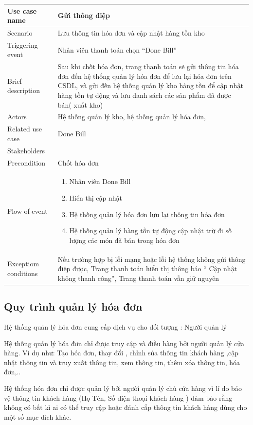\documentclass{article}
\begin{document}
\begin{tabular}{|m{4cm}|m{12cm}|}
		\hline
		Use case name & Gửi thông điệp\\
		\hline
		Scenario & Lưu thông tin hóa đơn và cập nhật hàng tồn kho\\
		\hline
		Triggering event & Nhân viên thanh toán chọn “Done Bill”\\
		\hline
		Brief description & Sau khi chốt hóa đơn, trang thanh toán sẽ gửi thông tin hóa đơn đến hệ thống quản lý hóa đơn để lưu lại hóa đơn trên CSDL, và gửi đến hệ thống quản lý kho hàng tồn để cập nhật hàng tồn tự dộng và lưu danh sách các sản phẩm đã được bán( xuất kho)\\
		\hline
		 Actors & Hệ thống quản lý kho, hệ thống quản lý hóa đơn,\\
		\hline
		Related use case & Done Bill\\
		\hline
		Stakeholders & \\
		\hline
		Precondition & Chốt hóa đơn\\
		\hline
		Flow of event & 
		\begin{enumerate}
			\item Nhân viên Done Bill
			\item Hiển thị cập nhật
			\item Hệ thống quản lý hóa đơn lưu lại thông tin hóa đơn
			\item Hệ thống quản lý hàng tồn tự động cập nhật trừ đi số lượng các món đã bán trong hóa đơn
		\end{enumerate}\\
	\hline
	Exceptiom conditions & Nếu trường hợp bị lỗi mạng hoặc lỗi hệ thống không gửi thông điệp được, Trang thanh toán hiển thị thông báo “ Cập nhật không thanh công”, Trang thanh toán vẫn giữ nguyên \\
	\hline
\end{tabular}
\pagebreak
\fontsize{14}{20}\selectfont\subsection{Quy trình quản lý hóa đơn}
Hệ thống quản lý hóa đơn cung cấp dịch vụ cho đối tượng : Người quản lý 

Hệ thống quản lý hóa đơn chỉ được truy cập và điều hàng bởi người quản lý cửa hàng. Ví dụ như: Tạo hóa đơn, thay đổi , chỉnh sủa thông tin khách hàng ,cập nhật thông tin và truy xuất thông tin, xem thông tin, thêm xóa thông tin, hóa đơn,..

Hệ thống hóa đơn chỉ được quản lý bởi người quản lý chủ cửa hàng  vì lí do bảo vệ thông tin khách hàng (Họ Tên, Số điện thoại khách hàng ) đảm bảo rằng không có bất kì ai có thể truy cập hoặc đánh cắp thông tin khách hàng dùng cho một số mục đích khác. 
\end{document}
